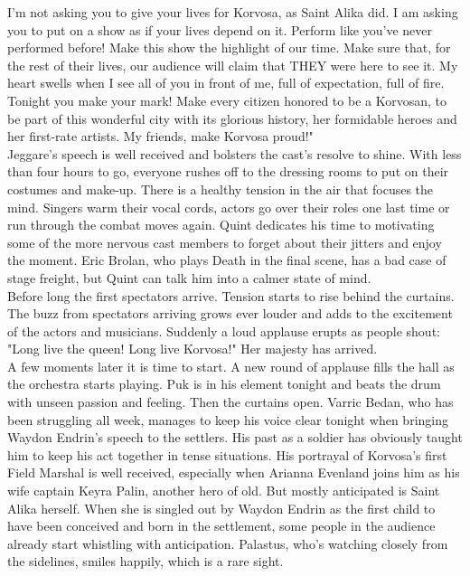 I'm not asking you to give your lives for Korvosa, as Saint Alika did. I am asking you to put on a show as if your lives depend on it. Perform like you've never performed before! Make this show the highlight of our time. Make sure that, for the rest of their lives, our audience will claim that THEY were here to see it. My heart swells when I see all of you in front of me, full of expectation, full of fire. Tonight you make your mark! Make every citizen honored to be a Korvosan, to be part of this wonderful city with its glorious history, her formidable heroes and her first-rate artists. My friends, make Korvosa proud!"\\

Jeggare's speech is well received and bolsters the cast's resolve to shine. With less than four hours to go, everyone rushes off to the dressing rooms to put on their costumes and make-up. There is a healthy tension in the air that focuses the mind. Singers warm their vocal cords, actors go over their roles one last time or run through the combat moves again. Quint dedicates his time to motivating some of the more nervous cast members to forget about their jitters and enjoy the moment. Eric Brolan, who plays Death in the final scene, has a bad case of stage freight, but Quint can talk him into a calmer state of mind.\\

Before long the first spectators arrive. Tension starts to rise behind the curtains. The buzz from spectators arriving grows ever louder and adds to the excitement of the actors and musicians. Suddenly a loud applause erupts as people shout: "Long live the queen! Long live Korvosa!" Her majesty has arrived.\\

A few moments later it is time to start. A new round of applause fills the hall as the orchestra starts playing. Puk is in his element tonight and beats the drum with unseen passion and feeling. Then the curtains open. Varric Bedan, who has been struggling all week, manages to keep his voice clear tonight when bringing Waydon Endrin's speech to the settlers. His past as a soldier has obviously taught him to keep his act together in tense situations. His portrayal of Korvosa's first Field Marshal is well received, especially when Arianna Evenland joins him as his wife captain Keyra Palin, another hero of old. But mostly anticipated is Saint Alika herself. When she is singled out by Waydon Endrin as the first child to have been conceived and born in the settlement, some people in the audience already start whistling with anticipation. Palastus, who's watching closely from the sidelines, smiles happily, which is a rare sight.\\

